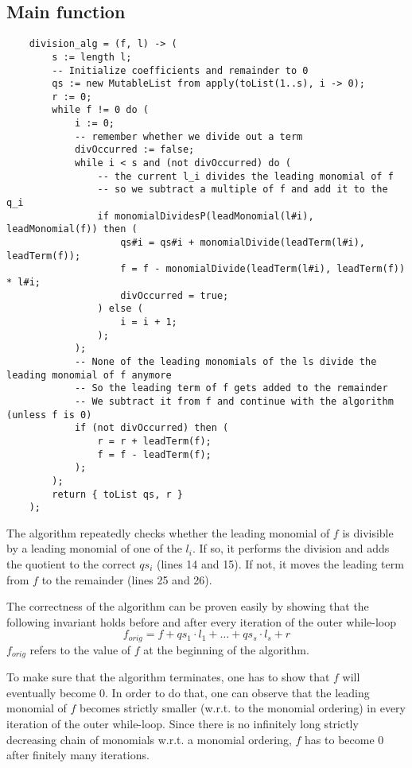 \documentclass[a4paper,article,math]{extarticle}
\begin{document}
\subsection{Main function}
\begin{lstlisting}
	division_alg = (f, l) -> (
		s := length l;
		-- Initialize coefficients and remainder to 0
		qs := new MutableList from apply(toList(1..s), i -> 0);
		r := 0;
		while f != 0 do (
			i := 0;
			-- remember whether we divide out a term
			divOccurred := false;
			while i < s and (not divOccurred) do (
				-- the current l_i divides the leading monomial of f
				-- so we subtract a multiple of f and add it to the q_i
				if monomialDividesP(leadMonomial(l#i), leadMonomial(f)) then (
					qs#i = qs#i + monomialDivide(leadTerm(l#i), leadTerm(f));
					f = f - monomialDivide(leadTerm(l#i), leadTerm(f)) * l#i;
					divOccurred = true;
				) else (
					i = i + 1;
				);
			);
			-- None of the leading monomials of the ls divide the leading monomial of f anymore
			-- So the leading term of f gets added to the remainder
			-- We subtract it from f and continue with the algorithm (unless f is 0)
			if (not divOccurred) then (
				r = r + leadTerm(f);
				f = f - leadTerm(f);
			);
		);
		return { toList qs, r }
	);
\end{lstlisting}
The algorithm repeatedly checks whether the leading monomial of $f$ is divisible by a leading monomial
of one of the $l_i$. If so, it performs the division and adds the quotient to the correct $qs_i$ (lines 14 and 15).
If not, it moves the leading term from $f$ to the remainder (lines 25 and 26).

The correctness of the algorithm can be proven easily by showing that the following invariant holds before and after
every iteration of the outer while-loop
$$f_{orig} = f + qs_1 \cdot l_1 + \dots + qs_s \cdot l_s + r$$
$f_{orig}$ refers to the value of $f$ at the beginning of the algorithm.

To make sure that the algorithm terminates, one has to show that $f$ will eventually become $0$.
In order to do that, one can observe that the leading monomial of $f$ becomes strictly smaller
(w.r.t. to the monomial ordering)
in every iteration of the outer while-loop.
Since there is no infinitely long strictly decreasing chain of monomials w.r.t. a monomial ordering,
$f$ has to become $0$ after finitely many iterations.
\nocite{*}


\end{document}
